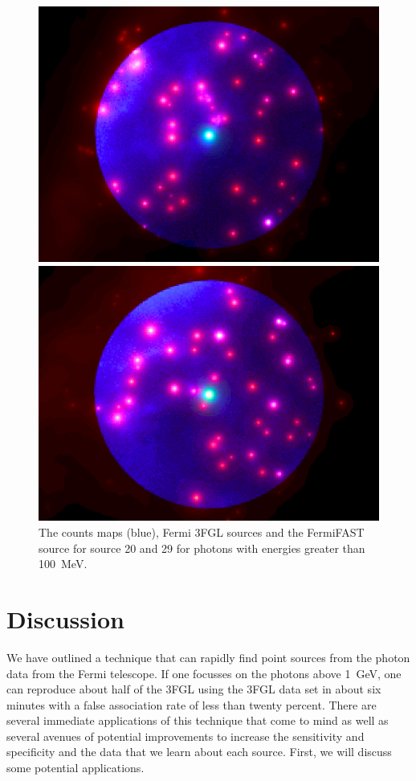 \documentclass[useAMS,usenatbib]{mn2e}
\begin{document}
\begin{figure}
  \includegraphics[width=\columnwidth]{src_20_combo}
  
  \includegraphics[width=\columnwidth]{src_29_combo}
  \caption{The counts maps (blue), Fermi 3FGL sources and the
    FermiFAST source for source 20 and 29 for photons with energies
    greater than 100~MeV.}
  \label{fig:100MeVcmap}
\end{figure}


\section{Discussion}
\label{sec:discussion}

We have outlined a technique that can rapidly find point sources from
the photon data from the Fermi telescope.  If one focusses on the
photons above 1~GeV, one can reproduce about half of the 3FGL using
the 3FGL data set in about six minutes with a false association rate of
less than twenty percent.  There are several immediate applications of
this technique that come to mind as well as several avenues of
potential improvements to increase the sensitivity and specificity
and the data that we learn about each source.  First, we will discuss
some potential applications.
\end{document}
